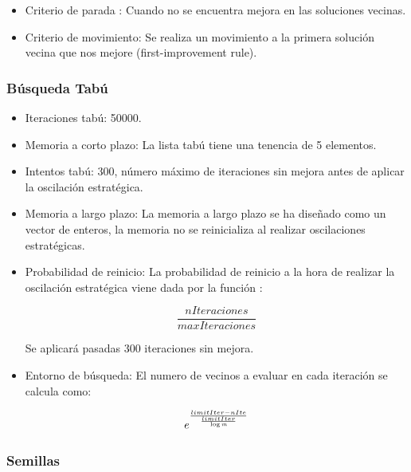 \documentclass{article}
\begin{document}
			\begin{itemize}
				
				\item Criterio de parada : Cuando no se encuentra mejora en las soluciones vecinas.
				
				\item Criterio de movimiento: Se realiza un movimiento a la primera solución vecina que nos mejore (first-improvement rule).
				
			\end{itemize}
				
	
		\subsubsection{Búsqueda Tabú}
		
			\begin{itemize}
				
				\item Iteraciones tabú: 50000.
				
				\item Memoria a corto plazo: La lista tabú tiene una tenencia de 5 elementos.
				
				\item Intentos tabú: 300, número máximo de iteraciones sin mejora antes de aplicar la oscilación estratégica.
				
				\item Memoria a largo plazo: La memoria a largo plazo se ha diseñado como un vector de enteros, la memoria no se reinicializa al realizar oscilaciones estratégicas.
				
				\item Probabilidad de reinicio: La probabilidad de reinicio a la hora de realizar la oscilación estratégica viene dada por la función :
				
				\[ \frac{nIteraciones}{maxIteraciones} \]
				
				Se aplicará pasadas 300 iteraciones sin mejora.
				
				\item Entorno de búsqueda: El numero de vecinos a evaluar en cada iteración se calcula como:
				
				\[ e^{\frac{limitIter - nIte}{ \frac{limitIter}{\log{\emph{m}}}}}\]
					
			\end{itemize}
	
	\subsubsection{Semillas}
	
\end{document}
